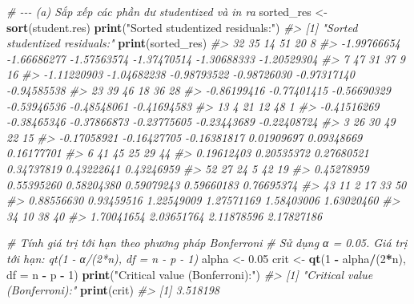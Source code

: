 \documentclass[
]{article}
\newenvironment{Shaded}{\begin{snugshade}}{\end{snugshade}}
\newcommand{\AttributeTok}[1]{\textcolor[rgb]{0.13,0.29,0.53}{#1}}
\newcommand{\CommentTok}[1]{\textcolor[rgb]{0.56,0.35,0.01}{\textit{#1}}}
\newcommand{\DecValTok}[1]{\textcolor[rgb]{0.00,0.00,0.81}{#1}}
\newcommand{\FloatTok}[1]{\textcolor[rgb]{0.00,0.00,0.81}{#1}}
\newcommand{\FunctionTok}[1]{\textcolor[rgb]{0.13,0.29,0.53}{\textbf{#1}}}
\newcommand{\NormalTok}[1]{#1}
\newcommand{\OtherTok}[1]{\textcolor[rgb]{0.56,0.35,0.01}{#1}}
\newcommand{\SpecialCharTok}[1]{\textcolor[rgb]{0.81,0.36,0.00}{\textbf{#1}}}
\newcommand{\StringTok}[1]{\textcolor[rgb]{0.31,0.60,0.02}{#1}}
\begin{document}
\begin{Shaded}
\begin{Highlighting}[]
\CommentTok{\# {-}{-}{-} (a) Sắp xếp các phần dư studentized và in ra}
\NormalTok{sorted\_res }\OtherTok{\textless{}{-}} \FunctionTok{sort}\NormalTok{(student.res)}
\FunctionTok{print}\NormalTok{(}\StringTok{"Sorted studentized residuals:"}\NormalTok{)}
\CommentTok{\#\textgreater{} [1] "Sorted studentized residuals:"}
\FunctionTok{print}\NormalTok{(sorted\_res)}
\CommentTok{\#\textgreater{}          32          35          14          51          20           8 }
\CommentTok{\#\textgreater{} {-}1.99766654 {-}1.66686277 {-}1.57563574 {-}1.37470514 {-}1.30688333 {-}1.20529304 }
\CommentTok{\#\textgreater{}           7          47          31          37           9          16 }
\CommentTok{\#\textgreater{} {-}1.11220903 {-}1.04682238 {-}0.98793522 {-}0.98726030 {-}0.97317140 {-}0.94585538 }
\CommentTok{\#\textgreater{}          23          39          46          18          36          28 }
\CommentTok{\#\textgreater{} {-}0.86199416 {-}0.77401415 {-}0.56690329 {-}0.53946536 {-}0.48548061 {-}0.41694583 }
\CommentTok{\#\textgreater{}          13           4          21          12          48           1 }
\CommentTok{\#\textgreater{} {-}0.41516269 {-}0.38465346 {-}0.37866873 {-}0.23775605 {-}0.23443689 {-}0.22408724 }
\CommentTok{\#\textgreater{}           3          26          30          49          22          15 }
\CommentTok{\#\textgreater{} {-}0.17058921 {-}0.16427705 {-}0.16381817  0.01909697  0.09348669  0.16177701 }
\CommentTok{\#\textgreater{}           6          41          45          25          29          44 }
\CommentTok{\#\textgreater{}  0.19612403  0.20535372  0.27680521  0.34737819  0.43222641  0.43246959 }
\CommentTok{\#\textgreater{}          52          27          24           5          42          19 }
\CommentTok{\#\textgreater{}  0.45278959  0.55395260  0.58204380  0.59079243  0.59660183  0.76695374 }
\CommentTok{\#\textgreater{}          43          11           2          17          33          50 }
\CommentTok{\#\textgreater{}  0.88556630  0.93459516  1.22549009  1.27571169  1.58403006  1.63020460 }
\CommentTok{\#\textgreater{}          34          10          38          40 }
\CommentTok{\#\textgreater{}  1.70041654  2.03651764  2.11878596  2.17827186}

\CommentTok{\# Tính giá trị tới hạn theo phương pháp Bonferroni}
\CommentTok{\# Sử dụng α = 0.05. Giá trị tới hạn: qt(1 {-} α/(2*n), df = n {-} p {-} 1)}
\NormalTok{alpha }\OtherTok{\textless{}{-}} \FloatTok{0.05}
\NormalTok{crit }\OtherTok{\textless{}{-}} \FunctionTok{qt}\NormalTok{(}\DecValTok{1} \SpecialCharTok{{-}}\NormalTok{ alpha}\SpecialCharTok{/}\NormalTok{(}\DecValTok{2}\SpecialCharTok{*}\NormalTok{n), }\AttributeTok{df =}\NormalTok{ n }\SpecialCharTok{{-}}\NormalTok{ p }\SpecialCharTok{{-}} \DecValTok{1}\NormalTok{)}
\FunctionTok{print}\NormalTok{(}\StringTok{"Critical value (Bonferroni):"}\NormalTok{)}
\CommentTok{\#\textgreater{} [1] "Critical value (Bonferroni):"}
\FunctionTok{print}\NormalTok{(crit)}
\CommentTok{\#\textgreater{} [1] 3.518198}
\end{Highlighting}
\end{Shaded}
\end{document}
